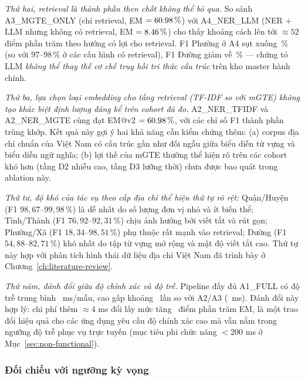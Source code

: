 \emph{Thứ hai, retrieval là thành phần then chốt không thể bỏ qua.} So sánh A3\_MGTE\_ONLY (chỉ retrieval, EM \(= 60.98\,\%\)) với A4\_NER\_LLM (NER + LLM nhưng không có retrieval, EM \(= 8.46\,\%\)) cho thấy khoảng cách lên tới \(\approx 52\) điểm phần trăm theo hướng có lợi cho retrieval. F1 Phường ở A4 sụt xuống \VNAIABLATIONAFourFOneWardPct\,\% (so với 97--98\,\% ở các cấu hình có retrieval), F1 Đường giảm về \VNAIABLATIONAFourFOneStreetPct\,\% --- chứng tỏ LLM \emph{không thể thay thế cơ chế truy hồi tri thức cấu trúc} trên kho master hành chính.

\emph{Thứ ba, lựa chọn loại embedding cho tầng retrieval (TF-IDF so với mGTE) không tạo khác biệt định lượng đáng kể trên cohort đã đo.} A2\_NER\_TFIDF và A2\_NER\_MGTE cùng đạt EM@v2 \(= 60.98\,\%\), với các chỉ số F1 thành phần trùng khớp. Kết quả này gợi ý hai khả năng cần kiểm chứng thêm: (a) corpus địa chỉ chuẩn của Việt Nam có cấu trúc gần như đối ngẫu giữa biểu diễn từ vựng và biểu diễn ngữ nghĩa; (b) lợi thế của mGTE thường thể hiện rõ trên các cohort khó hơn (tầng D2 nhiễu cao, tầng D3 lưỡng thời) chưa được bao quát trong ablation này.

\emph{Thứ tư, độ khó của tác vụ theo cấp địa chỉ thể hiện thứ tự rõ rệt:} Quận/Huyện (F1 \(98{,}67\)--\(99{,}98\,\%\)) là dễ nhất do số lượng đơn vị nhỏ và ít biến thể; Tỉnh/Thành (F1 \(76{,}92\)--\(92{,}31\,\%\)) chịu ảnh hưởng bởi viết tắt và rút gọn; Phường/Xã (F1 \(18{,}34\)--\(98{,}51\,\%\)) phụ thuộc rất mạnh vào retrieval; Đường (F1 \(54{,}88\)--\(82{,}71\,\%\)) khó nhất do tập từ vựng mở rộng và mật độ viết tắt cao. Thứ tự này hợp với phân tích hình thái dữ liệu địa chỉ Việt Nam đã trình bày ở Chương~\ref{ch:literature-review}.

\emph{Thứ năm, đánh đổi giữa độ chính xác và độ trễ.} Pipeline đầy đủ A1\_FULL có độ trễ trung bình \VNAIABLATIONAOneLatencyMs\, ms/mẫu, cao gấp khoảng \VNAIABLATIONLatencyOverheadFactor\, lần so với A2/A3 (\VNAIABLATIONATwoLatencyMs\, ms). Đánh đổi này hợp lý: chi phí thêm \(\approx 4\) ms đổi lấy mức tăng \VNAIABLATIONLLMContributionPp\, điểm phần trăm EM, là một trao đổi hiệu quả cho các ứng dụng yêu cầu độ chính xác cao mà vẫn nằm trong ngưỡng độ trễ phục vụ trực tuyến (mục tiêu phi chức năng \(< 200\) ms ở Mục~\ref{sec:non-functional}).

\subsubsection{Đối chiếu với ngưỡng kỳ vọng}
\label{sec:exp-ablation-vs-thresholds}

